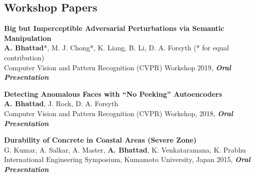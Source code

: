 \documentclass[margin,line]{res}
\begin{document}
\begin{resume}
\section{\sc \large Workshop Papers}
\begin{etaremune}[start=3, leftmargin=12pt]
\item {\bf Big but Imperceptible Adversarial Perturbations via Semantic Manipulation}\\
{{\bf A. Bhattad}*, M. J. Chong*, K. Liang, B. Li, D. A. Forsyth} \hfill{(* for equal contribution)} \\
Computer Vision and Pattern Recognition (CVPR) Workshop 2019, {\bf \emph{Oral Presentation}} 
\item {\bf Detecting Anomalous Faces with ``No Peeking'' Autoencoders}\\
{{\bf A. Bhattad}, J. Rock, D. A. Forsyth}\\ 
{Computer Vision and Pattern Recognition (CVPR) Workshop, 2018, {\bf \emph {Oral Presentation}}}
\item {\bf Durability of Concrete in Coastal Areas (Severe Zone)}\\
G. Kumar, A. Salkar, A. Master, {\bf A. Bhattad}, K. Venkataramana, K. Prabhu \\
International Engineering Symposium, Kumamoto University, Japan 2015, {\bf \emph {Oral Presentation}}
\end{etaremune}





\end{resume}
\end{document}
